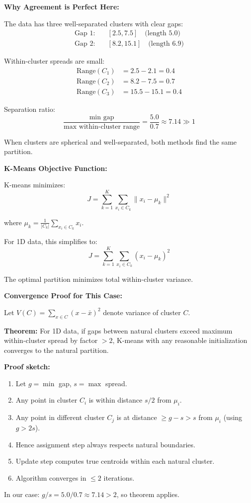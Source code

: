 \documentclass[12pt]{article}
\begin{document}
\begin{explanation}

\textbf{Why Agreement is Perfect Here:}

The data has three well-separated clusters with clear gaps:
\begin{align*}
\text{Gap 1:} &\quad [2.5, 7.5] \quad \text{(length 5.0)} \\
\text{Gap 2:} &\quad [8.2, 15.1] \quad \text{(length 6.9)}
\end{align*}

Within-cluster spreads are small:
\begin{align*}
\text{Range}(C_1) &= 2.5 - 2.1 = 0.4 \\
\text{Range}(C_2) &= 8.2 - 7.5 = 0.7 \\
\text{Range}(C_3) &= 15.5 - 15.1 = 0.4
\end{align*}

Separation ratio:
\[
\frac{\text{min gap}}{\text{max within-cluster range}} = \frac{5.0}{0.7} \approx 7.14 \gg 1
\]

When clusters are spherical and well-separated, both methods find the same partition.

\textbf{K-Means Objective Function:}

K-means minimizes:
\[
J = \sum_{k=1}^K \sum_{x_i \in C_k} \|x_i - \mu_k\|^2
\]

where $\mu_k = \frac{1}{|C_k|}\sum_{x_i \in C_k} x_i$.

For 1D data, this simplifies to:
\[
J = \sum_{k=1}^K \sum_{x_i \in C_k} (x_i - \mu_k)^2
\]

The optimal partition minimizes total within-cluster variance.

\textbf{Convergence Proof for This Case:}

Let $V(C) = \sum_{x \in C}(x - \bar{x})^2$ denote variance of cluster $C$.

\textbf{Theorem:} For 1D data, if gaps between natural clusters exceed maximum within-cluster spread by factor $>2$, K-means with any reasonable initialization converges to the natural partition.

\textbf{Proof sketch:}
\begin{enumerate}
\item Let $g = \min$ gap, $s = \max$ spread.
\item Any point in cluster $C_i$ is within distance $s/2$ from $\mu_i$.
\item Any point in different cluster $C_j$ is at distance $\geq g - s > s$ from $\mu_i$ (using $g > 2s$).
\item Hence assignment step always respects natural boundaries.
\item Update step computes true centroids within each natural cluster.
\item Algorithm converges in $\leq 2$ iterations.
\end{enumerate}

In our case: $g/s = 5.0/0.7 \approx 7.14 > 2$, so theorem applies.

\end{explanation}
\end{document}
